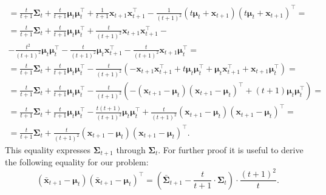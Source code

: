 \documentclass[12pt]{article}
\begin{document}
{\begin{enumerate}
\begin{gather*}
		= \frac{t}{t+1}\mathbf{\Sigma}_t + \frac{t}{t+1}\boldsymbol{\mu}_{t} \boldsymbol{\mu}_{t}^\intercal + \frac{1}{t+1} \mathbf{x}_{t+1} \mathbf{x}_{t+1}^\intercal - \frac{1}{(t+1)^2} (t \boldsymbol{\mu}_t + \mathbf{x}_{t+1})(t \boldsymbol{\mu}_t + \mathbf{x}_{t+1})^\intercal =\\
		= \frac{t}{t+1}\mathbf{\Sigma}_t + \frac{t}{t+1}\boldsymbol{\mu}_{t} \boldsymbol{\mu}_{t}^\intercal + \frac{t}{(t+1)^2} \mathbf{x}_{t+1} \mathbf{x}_{t+1}^\intercal -\\- \frac{t^2}{(t+1)^2}\boldsymbol{\mu}_{t} \boldsymbol{\mu}_{t}^\intercal - \frac{t}{(t+1)^2}\boldsymbol{\mu}_{t} \mathbf{x}_{t+1}^\intercal - \frac{t}{(t+1)^2}\mathbf{x}_{t+1} \boldsymbol{\mu}_{t}^\intercal =\\
		= \frac{t}{t+1}\mathbf{\Sigma}_t + \frac{t}{t+1}\boldsymbol{\mu}_{t} \boldsymbol{\mu}_{t}^\intercal - \frac{t}{(t+1)^2} \left( -\mathbf{x}_{t+1} \mathbf{x}_{t+1}^\intercal + t\boldsymbol{\mu}_{t} \boldsymbol{\mu}_{t}^\intercal + \boldsymbol{\mu}_{t} \mathbf{x}_{t+1}^\intercal + \mathbf{x}_{t+1} \boldsymbol{\mu}_{t}^\intercal \right) =\\
		= \frac{t}{t+1}\mathbf{\Sigma}_t + \frac{t}{t+1}\boldsymbol{\mu}_{t} \boldsymbol{\mu}_{t}^\intercal - \frac{t}{(t+1)^2} \left( -(\mathbf{x}_{t+1}-\boldsymbol{\mu}_t)(\mathbf{x}_{t+1}-\boldsymbol{\mu}_t)^\intercal + (t+1)\boldsymbol{\mu}_{t} \boldsymbol{\mu}_{t}^\intercal \right) =\\
		= \frac{t}{t+1}\mathbf{\Sigma}_t + \frac{t}{t+1}\boldsymbol{\mu}_{t} \boldsymbol{\mu}_{t}^\intercal - \frac{t(t+1)}{(t+1)^2}\boldsymbol{\mu}_{t} \boldsymbol{\mu}_{t}^\intercal + \frac{t}{(t+1)^2}(\mathbf{x}_{t+1}-\boldsymbol{\mu}_t)(\mathbf{x}_{t+1}-\boldsymbol{\mu}_t)^\intercal =\\
		= \frac{t}{t+1}\mathbf{\Sigma}_t + \frac{t}{(t+1)^2}(\mathbf{x}_{t+1}-\boldsymbol{\mu}_t)(\mathbf{x}_{t+1}-\boldsymbol{\mu}_t)^\intercal.
	\end{gather*}
	This equality expresses $\mathbf{\Sigma}_{t+1}$ through $\mathbf{\Sigma}_t$. For further proof it is useful to derive the following equality for our problem: \[(\bar{\mathbf{x}}_{t+1}-\boldsymbol{\mu}_t)(\bar{\mathbf{x}}_{t+1}-\boldsymbol{\mu}_t)^\intercal = \left(\bar{\mathbf{\Sigma}}_{t+1} - \frac{t}{t+1} \cdot \mathbf{\Sigma}_t \right) \cdot \frac{(t+1)^2}{t}.\]
	

\end{enumerate}}
\end{document}
